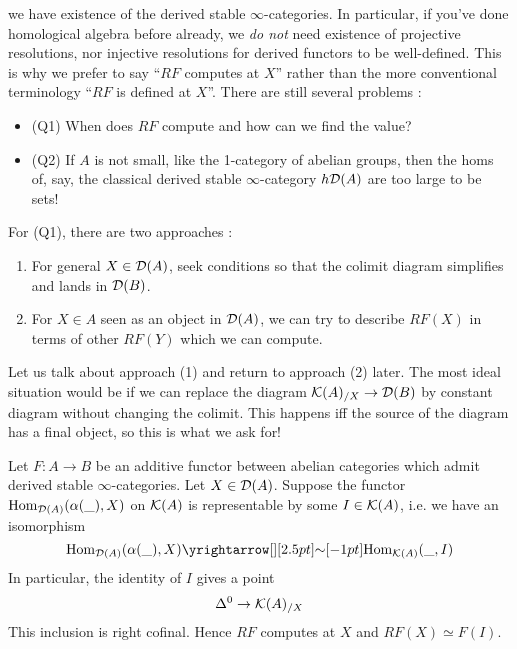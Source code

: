 \documentclass{article}
\begin{document}
we have existence of the derived stable $\infty$-categories.
In particular, if you've done homological algebra before already,
we \emph{do not} need existence of projective resolutions,
nor injective resolutions for derived functors to be well-defined.
This is why we prefer to say ``$RF$ computes at $X$'' rather than
the more conventional terminology ``$RF$ is defined at $X$''.
There are still several problems : 
\begin{itemize}
  \item (Q1) When does $RF$ compute and how can we find the value?
  \item (Q2) If $A$ is not small, like the 1-category of abelian groups,
  then the homs of, say, the classical derived stable $\infty$-category $h \mathcal{D}(A)$
  are too large to be sets!
\end{itemize}
For (Q1), there are two approaches : 
\begin{enumerate}
  \item For general $X \in \mathcal{D}(A)$, seek conditions so that
  the colimit diagram simplifies and lands in $\mathcal{D}(B)$.
  \item For $X \in A$ seen as an object in $\mathcal{D}(A)$,
  we can try to describe $RF(X)$ in terms of
  other $RF(Y)$ which we can compute.
\end{enumerate}
Let us talk about approach (1) and return to approach (2) later.
The most ideal situation would be if we can replace the diagram 
$\mathcal{K}(A)_{/ X} \to \mathcal{D}(B)$
by constant diagram without changing the colimit.
This happens iff the source of the diagram has a final object,
\cite[\href{https://kerodon.net/tag/03LQ}{Tag 03LQ}]{kerodon}
so this is what we ask for!
\begin{prop}\label{derived:cofinal}
  
  Let $F : A \to B$ be an additive functor between abelian categories
  which admit derived stable $\infty$-categories.
  Let $X \in \mathcal{D}(A)$. Suppose the functor 
  $\mathrm{Hom}_{\mathcal{D}(A)}(\alpha(\_) , X)$ on $\mathcal{K}(A)$ is representable
  by some $I \in \mathcal{K}(A)$, i.e. we have an isomorphism \[
    \HOM_{\cD(A)}(\al(\_) , X) \map{\sim}{} \HOM_{\cK(A)}(\_ , I)
  \]
  In particular, the identity of $I$ gives 
  a point \[
    \Delta^0 \to \mathcal{K}(A)_{/ X}
  \]
  This inclusion is right cofinal.
  Hence $RF$ computes at $X$ and $RF(X) \simeq F(I)$.
\end{prop}
\end{document}
